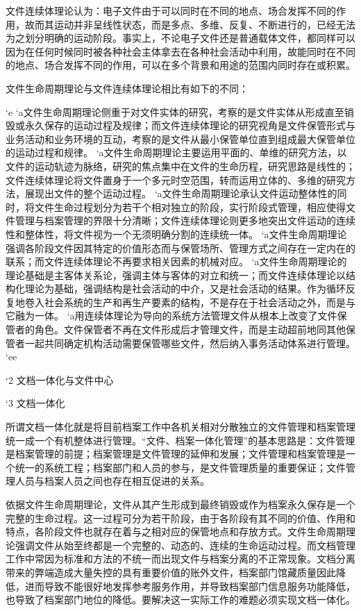     文件连续体理论认为：电子文件由于可以同时在不同的地点、场合发挥不同的作用，故而其运动并非呈线性状态，而是多点、多维、反复、不断进行的，已经无法为之划分明确的运动阶段。事实上，不论电子文件还是普通载体文件，都同样可以因为在任何时候同时被各种社会主体拿去在各种社会活动中利用，故能同时在不同的地点、场合发挥不同的作用，可以在多个背景和用途的范围内同时存在或积累。

    文件生命周期理论与文件连续体理论相比有如下的不同：

    `e
        `a文件生命周期理论侧重于对文件实体的研究，考察的是文件实体从形成直至销毁或永久保存的运动过程及规律；而文件连续体理论的研究视角是文件保管形式与业务活动和业务环境的互动，考察的是文件从最小保管单位直到组成最大保管单位的运动过程和规律。
        `a文件生命周期理论主要运用平面的、单维的研究方法，以文件的运动轨迹为脉络，研究的焦点集中在文件的生命历程，研究思路是线性的；文件连续体理论将文件置身于一个多元时空范围，转而运用立体的、多维的研究方法，展现出文件的整个运动过程。
        `a文件生命周期理论承认文件运动整体性的同时，将文件生命过程划分为若干个相对独立的阶段，实行阶段式管理，相应使得文件管理与档案管理的界限十分清晰；文件连续体理论则更多地突出文件运动的连续性和整体性，将文件视为一个无须明确分割的连续统一体。
        `a文件生命周期理论强调各阶段文件因其特定的价值形态而与保管场所、管理方式之间存在一定内在的联系；而文件连续体理论不再要求相关因素的机械对应。
        `a文件生命周期理论的理论基础是主客体关系论，强调主体与客体的对立和统一；而文件连续体理论以结构化理论为基础，强调结构是社会活动的中介，又是社会活动的结果。作为循环反复地卷入社会系统的生产和再生产要素的结构，不是存在于社会活动之外，而是与它融为一体。
        `a用连续体理论为导向的系统方法管理文件从根本上改变了文件保管者的角色。文件保管者不再在文件形成后才管理文件，而是主动超前地同其他保管者一起共同确定机构活动需要保管哪些文件，然后纳入事务活动体系进行管理。
    `ee

`2 文档一体化与文件中心

    `3 文档一体化

    所谓文档一体化就是将目前档案工作中各机关相对分散独立的文件管理和档案管理统一成一个有机整体进行管理。“文件、档案一体化管理”的基本思路是：文件管理是档案管理的前提；档案管理是文件管理的延伸和发展；文件管理和档案管理是一个统一的系统工程；档案部门和人员的参与，是文件管理质量的重要保证；文件管理人员与档案人员之间也存在相互促进的关系。

    依据文件生命周期理论，文件从其产生形成到最终销毁或作为档案永久保存是一个完整的生命过程。这一过程可分为若干阶段，由于各阶段有其不同的价值、作用和特点，各阶段文件也就存在着与之相对应的保管地点和存放方式。文件生命周期理论强调文件从始至终都是一个完整的、动态的、连续的生命运动过程。而文档管理工作中常因为标准和方法的不统一而出现文件与档案分离的不正常现象。文档分离带来的弊端造成大量失控的具有重要价值的账外文件，档案部门馆藏质量因此降低，进而导致不能很好地发挥参考服务作用，并导致档案部门信息服务功能降低，也导致了档案部门地位的降低。要解决这一实际工作的难题必须实现文档一体化。


